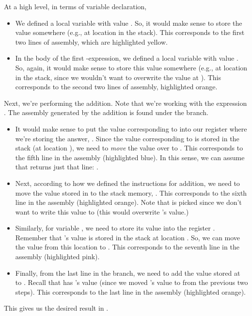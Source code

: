 \documentclass[letterpaper]{article}
\begin{document}
\begin{mdframed}
    At a high level, in terms of variable declaration, 
    \begin{itemize}
        \item We defined a local variable  with value . So, it would make sense to store the value somewhere (e.g., at location  in the stack). This corresponds to the first two lines of assembly, which are highlighted yellow.
        \item In the body of the first -expression, we defined a local variable  with value . So, again, it would make sense to store this value somewhere (e.g., at location  in the stack, since we wouldn't want to overwrite the value at ). This corresponds to the second two lines of assembly, highlighted orange. 
    \end{itemize}
    Next, we're performing the addition. Note that we're working with the expression . The assembly generated by the addition is found under the  branch.   
    \begin{itemize}
        \item It would make sense to put the value corresponding to  into our register where we're storing the answer, . Since the value corresponding to  is stored in the stack (at location ), we need to \emph{move} the value over to . This corresponds to the fifth line in the assembly (highlighted blue). In this sense, we can assume that  returns just that line: .
        \item Next, according to how we defined the instructions for addition, we need to move the value stored in  to the stack memory, \code{[rsp - 32]}. This corresponds to the sixth line in the assembly (highlighted orange). Note that  is picked since we don't want to write this value to  (this would overwrite 's value.)
        \item Similarly, for variable , we need to store its value into the register . Remember that 's value is stored in the stack at location . So, we can move the value from this location to . This corresponds to the seventh line in the assembly (highlighted pink).
        \item Finally, from the last line in the  branch, we need to add the value stored at  to . Recall that \code{[rsp - 32]} has 's value (since we moved 's value to \code{[rsp - 32]} from the previous two steps). This corresponds to the last line in the assembly (highlighted orange).
    \end{itemize}
    This gives us the desired result in .
\end{mdframed}
\end{document}
